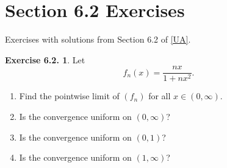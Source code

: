 \documentclass[12pt]{article}
\theoremstyle{definition}
\theoremstyle{exercise}
\newtheorem{exercise}{Exercise 6.2.}
\theoremstyle{solution}
\begin{document}
\section{Section 6.2 Exercises}

Exercises with solutions from Section 6.2 of \hyperlink{ua}{[UA]}.

\begin{exercise}
\label{ex:1}
    Let
    \[
        f_n(x) = \frac{nx}{1 + nx^2}.
    \]
    \begin{enumerate}
        \item Find the pointwise limit of \( (f_n) \) for all \( x \in (0, \infty) \).

        \item Is the convergence uniform on \( (0, \infty) \)?

        \item Is the convergence uniform on \( (0, 1) \)?

        \item Is the convergence uniform on \( (1, \infty) \)?
    \end{enumerate}
\end{exercise}
\end{document}
